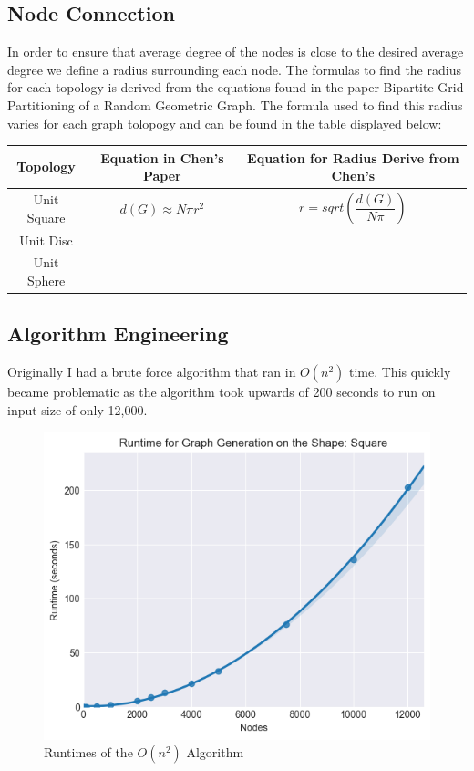 \documentclass{article}
\begin{document}
    \subsection{Node Connection}
    In order to ensure that average degree of the nodes is close to the desired average degree we define a radius surrounding each node.
    The formulas to find the radius for each topology is derived from the equations found in the paper Bipartite Grid Partitioning of a Random Geometric Graph\cite{chen2017bipartite}.
    The formula used to find this radius varies for each graph tolopogy and can be found in the table displayed below:

    \begin{tabular}{ |c|c|c| }
  	  \hline
  	  Topology & Equation in Chen's Paper & Equation for Radius Derive from Chen's \\
  	  \hline
  	  Unit Square & $d(G) \approx N\pi r^2 $ & $r = sqrt(\dfrac{d(G)}{N\pi})$ \\
  	  \hline
  	  Unit Disc & & \\
  	  \hline
  	  Unit Sphere & & \\
  	  \hline
    \end{tabular}

	  \subsection{Algorithm Engineering}
	  Originally I had a brute force algorithm that ran in $O(n^2)$ time.
	  This quickly became problematic as the algorithm took upwards of 200 seconds to run on input size of only 12,000.
	  \begin{figure}[H]
		\centering
		\includegraphics[width=1 \textwidth]{square/runtime/runtime_chart_naive}
		\caption{Runtimes of the $O(n^2)$ Algorithm}
	  \end{figure}
\end{document}
